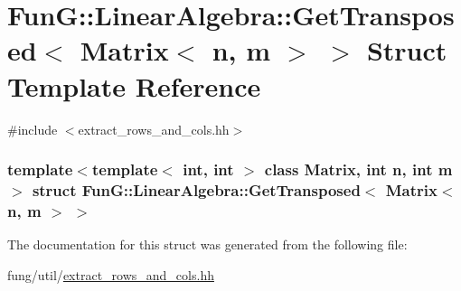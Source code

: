 \hypertarget{structFunG_1_1LinearAlgebra_1_1GetTransposed_3_01Matrix_3_01n_00_01m_01_4_01_4}{\section{\-Fun\-G\-:\-:\-Linear\-Algebra\-:\-:\-Get\-Transposed$<$ \-Matrix$<$ n, m $>$ $>$ \-Struct \-Template \-Reference}
\label{structFunG_1_1LinearAlgebra_1_1GetTransposed_3_01Matrix_3_01n_00_01m_01_4_01_4}
}


{\ttfamily \#include $<$extract\-\_\-rows\-\_\-and\-\_\-cols.\-hh$>$}

\subsubsection*{template$<$template$<$ int, int $>$ class \-Matrix, int n, int m$>$ struct Fun\-G\-::\-Linear\-Algebra\-::\-Get\-Transposed$<$ Matrix$<$ n, m $>$ $>$}



\-The documentation for this struct was generated from the following file\-:\begin{DoxyCompactItemize}
\item 
fung/util/\hyperlink{extract__rows__and__cols_8hh}{extract\-\_\-rows\-\_\-and\-\_\-cols.\-hh}\end{DoxyCompactItemize}
